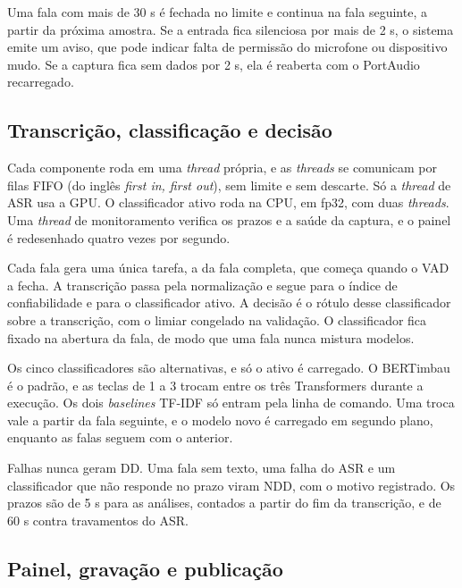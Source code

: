 \documentclass[
    12pt,                %
    openright,           %
    oneside,             %
    a4paper,             %
    english,             %
    brazil               %
]{abntex2}
\begin{document}
Uma fala com mais de 30 s é fechada no limite e continua na fala seguinte, a partir da próxima amostra. Se a entrada fica silenciosa por mais de 2 s, o sistema emite um aviso, que pode indicar falta de permissão do microfone ou dispositivo mudo. Se a captura fica sem dados por 2 s, ela é reaberta com o PortAudio recarregado.


\subsection{Transcrição, classificação e decisão}
\label{sec:decisao}

Cada componente roda em uma \textit{thread} própria, e as \textit{threads} se comunicam por filas FIFO (do inglês \textit{first in, first out}), sem limite e sem descarte. Só a \textit{thread} de ASR usa a GPU. O classificador ativo roda na CPU, em fp32, com duas \textit{threads}. Uma \textit{thread} de monitoramento verifica os prazos e a saúde da captura, e o painel é redesenhado quatro vezes por segundo.

Cada fala gera uma única tarefa, a da fala completa, que começa quando o VAD a fecha. A transcrição passa pela normalização e segue para o índice de confiabilidade e para o classificador ativo. A decisão é o rótulo desse classificador sobre a transcrição, com o limiar congelado na validação. O classificador fica fixado na abertura da fala, de modo que uma fala nunca mistura modelos.

Os cinco classificadores são alternativas, e só o ativo é carregado. O BERTimbau é o padrão, e as teclas de 1 a 3 trocam entre os três Transformers durante a execução. Os dois \textit{baselines} TF-IDF só entram pela linha de comando. Uma troca vale a partir da fala seguinte, e o modelo novo é carregado em segundo plano, enquanto as falas seguem com o anterior.

Falhas nunca geram DD. Uma fala sem texto, uma falha do ASR e um classificador que não responde no prazo viram NDD, com o motivo registrado. Os prazos são de 5 s para as análises, contados a partir do fim da transcrição, e de 60 s contra travamentos do ASR.


\subsection{Painel, gravação e publicação}
\label{sec:painel_publicacao}
\end{document}

